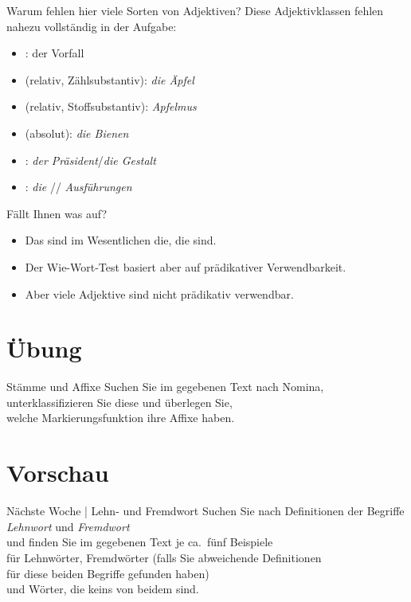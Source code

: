 \begin{frame}
  {Warum fehlen hier viele Sorten von Adjektiven?}
  \pause
  \small
  Diese Adjektivklassen fehlen nahezu vollständig in der Aufgabe:
  \pause
  \begin{itemize}[<+->]
    \item {}: der  Vorfall
    \item {} (relativ, Zählsubstantiv): \textit{die  Äpfel}
    \item {} (relativ, Stoffsubstantiv): \textit{ Apfelmus}
    \item {} (absolut): \textit{die  Bienen}
    \item {}: \textit{der  Präsident}\slash\textit{die  Gestalt}
    \item {}: \textit{die }/\textit{}/\textit{ Ausführungen}
  \end{itemize}
  \pause
  \Halbzeile
  Fällt Ihnen was auf?
  \pause
  \begin{itemize}[<+->]
    \item Das sind im Wesentlichen die, die  sind.
    \item Der Wie-Wort-Test basiert aber auf prädikativer Verwendbarkeit.
    \item Aber viele Adjektive sind nicht prädikativ verwendbar. 
  \end{itemize}
  \pause
  \centering
\end{frame}



\section{Übung}

\begin{frame}
  {Stämme und Affixe}
  \Zeile
  \centering 
  Suchen Sie im gegebenen Text nach \alert{Nomina},\\
  unterklassifizieren Sie diese und überlegen Sie,\\
  welche Markierungsfunktion ihre Affixe haben.\\
\end{frame}

\section{Vorschau}

\begin{frame}
  {Nächste Woche | Lehn- und Fremdwort}
  \Zeile
  \centering 
  Suchen Sie nach \alert{Definitionen der Begriffe \textit{Lehnwort} und \textit{Fremdwort}}\\
  und finden Sie im gegebenen Text je ca.\ fünf \alert{Beispiele}\\
  für Lehnwörter, Fremdwörter (falls Sie abweichende Definitionen\\
  für diese beiden Begriffe gefunden haben)\\
  und Wörter, die keins von beidem sind.
\end{frame}
